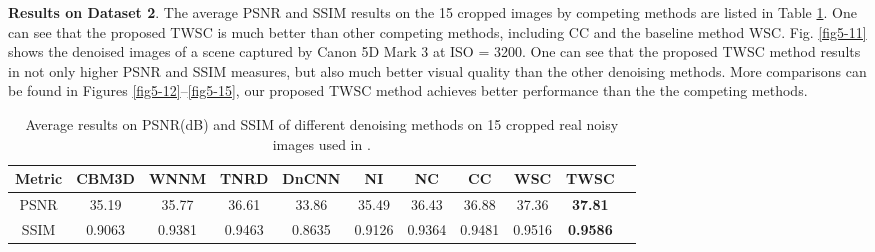 \textbf{Results on Dataset 2}. The average PSNR and SSIM results on the 15 cropped images by competing methods are listed in Table \ref{tab5-2}. One can see that the proposed TWSC is much better than other competing methods, including CC and the baseline method WSC. Fig. \ref{fig5-11} shows the denoised images of a scene captured by Canon 5D Mark 3 at ISO = 3200. One can see that the proposed TWSC method results in not only higher PSNR and SSIM measures, but also much better visual quality than the other denoising methods. More comparisons can be found in Figures \ref{fig5-12}--\ref{fig5-15}, our proposed TWSC method achieves better performance than the the competing methods.


\begin{table}[hbp]
\caption{Average results on PSNR(dB) and SSIM of different denoising methods on 15 cropped real noisy images used in \cite{crosschannel2016}.}
\label{tab5-2}
\begin{center}
\renewcommand\arraystretch{1}
\scriptsize
\begin{tabular*}{1\textwidth}{@{\extracolsep{\fill}}ccccccccccc}
\hline
Metric
&
\textbf{CBM3D}
&
\textbf{WNNM}
&
\textbf{TNRD}
&
\textbf{DnCNN}
&
\textbf{NI}
&
\textbf{NC}
&
\textbf{CC}
&
\textbf{WSC}
&
\textbf{TWSC}
\\
\hline
PSNR & 35.19 & 35.77 & 36.61 & 33.86 & 35.49 & 36.43  & 36.88 & 37.36 & \textbf{37.81}
\\
\hline
SSIM & 0.9063 & 0.9381 & 0.9463 & 0.8635 & 0.9126 & 0.9364 & 0.9481 & 0.9516 & \textbf{0.9586}
\\
\hline
\end{tabular*}
\end{center}
\end{table}


